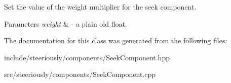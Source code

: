 Set the value of the weight multiplier for the seek component. 


\begin{DoxyParams}{Parameters}
{\em weight} & -\/ a plain old float. \\
\hline
\end{DoxyParams}


The documentation for this class was generated from the following files\-:\begin{DoxyCompactItemize}
\item 
include/steeriously/components/Seek\-Component.\-hpp\item 
src/steeriously/components/Seek\-Component.\-cpp\end{DoxyCompactItemize}
